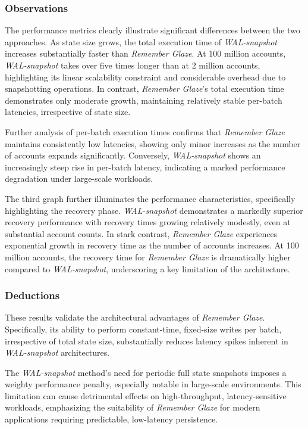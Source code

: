 \documentclass[conference]{IEEEtran}
\begin{document}
\subsubsection{Observations}

The performance metrics clearly illustrate significant differences between the two approaches. As state size grows, the total execution time of \textit{WAL-snapshot} increases substantially faster than \textit{Remember Glaze}. At 100 million accounts, \textit{WAL-snapshot} takes over five times longer than at 2 million accounts, highlighting its linear scalability constraint and considerable overhead due to snapshotting operations. In contrast, \textit{Remember Glaze}'s total execution time demonstrates only moderate growth, maintaining relatively stable per-batch latencies, irrespective of state size.

Further analysis of per-batch execution times confirms that \textit{Remember Glaze} maintains consistently low latencies, showing only minor increases as the number of accounts expands significantly. Conversely, \textit{WAL-snapshot} shows an increasingly steep rise in per-batch latency, indicating a marked performance degradation under large-scale workloads.

The third graph further illuminates the performance characteristics, specifically highlighting the recovery phase. \textit{WAL-snapshot} demonstrates a markedly superior recovery performance with recovery times growing relatively modestly, even at substantial account counts. In stark contrast, \textit{Remember Glaze} experiences exponential growth in recovery time as the number of accounts increases. At 100 million accounts, the recovery time for \textit{Remember Glaze} is dramatically higher compared to \textit{WAL-snapshot}, underscoring a key limitation of the architecture.

\subsubsection{Deductions}

These results validate the architectural advantages of \textit{Remember Glaze}. Specifically, its ability to perform constant-time, fixed-size writes per batch, irrespective of total state size, substantially reduces latency spikes inherent in \textit{WAL-snapshot} architectures.

The \textit{WAL-snapshot} method's need for periodic full state snapshots imposes a weighty performance penalty, especially notable in large-scale environments. This limitation can cause detrimental effects on high-throughput, latency-sensitive workloads, emphasizing the suitability of \textit{Remember Glaze} for modern applications requiring predictable, low-latency persistence.
\end{document}
